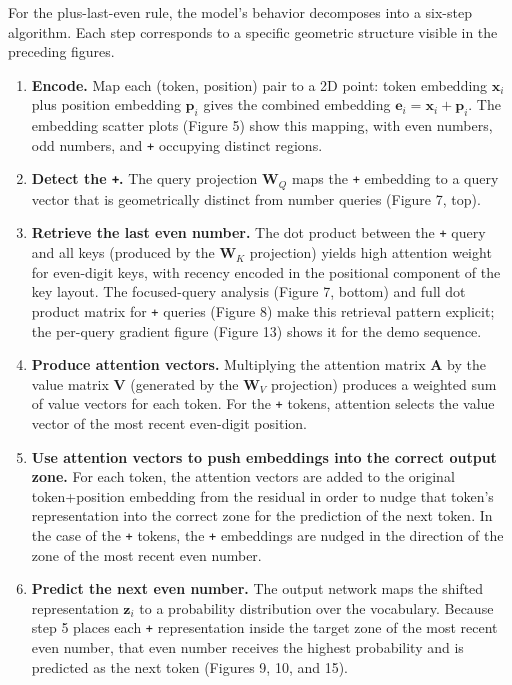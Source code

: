 \documentclass[
  11pt,
  a4paper,
]{article}
\begin{document}
For the plus-last-even rule, the model's behavior decomposes into a
six-step algorithm. Each step corresponds to a specific geometric
structure visible in the preceding figures.

\begin{enumerate}
\def\labelenumi{\arabic{enumi}.}
\item
  \textbf{Encode.} Map each (token, position) pair to a 2D point: token
  embedding \(\mathbf{x}_i\) plus position embedding \(\mathbf{p}_i\)
  gives the combined embedding
  \(\mathbf{e}_i = \mathbf{x}_i + \mathbf{p}_i\). The embedding scatter
  plots (Figure 5) show this mapping, with even numbers, odd numbers,
  and \texttt{+} occupying distinct regions.
\item
  \textbf{Detect the \texttt{+}.} The query projection \(\mathbf{W}_Q\)
  maps the \texttt{+} embedding to a query vector that is geometrically
  distinct from number queries (Figure 7, top).
\item
  \textbf{Retrieve the last even number.} The dot product between the
  \texttt{+} query and all keys (produced by the \(\mathbf{W}_K\)
  projection) yields high attention weight for even-digit keys, with
  recency encoded in the positional component of the key layout. The
  focused-query analysis (Figure 7, bottom) and full dot product matrix
  for \texttt{+} queries (Figure 8) make this retrieval pattern
  explicit; the per-query gradient figure (Figure 13) shows it for the
  demo sequence.
\item
  \textbf{Produce attention vectors.} Multiplying the attention matrix
  \(\mathbf{A}\) by the value matrix \(\mathbf{V}\) (generated by the
  \(\mathbf{W}_V\) projection) produces a weighted sum of value vectors
  for each token. For the \texttt{+} tokens, attention selects the value
  vector of the most recent even-digit position.
\item
  \textbf{Use attention vectors to push embeddings into the correct
  output zone.} For each token, the attention vectors are added to the
  original token+position embedding from the residual in order to nudge
  that token's representation into the correct zone for the prediction
  of the next token. In the case of the \texttt{+} tokens, the
  \texttt{+} embeddings are nudged in the direction of the zone of the
  most recent even number.
\item
  \textbf{Predict the next even number.} The output network maps the
  shifted representation \(\mathbf{z}_i\) to a probability distribution
  over the vocabulary. Because step 5 places each \texttt{+}
  representation inside the target zone of the most recent even number,
  that even number receives the highest probability and is predicted as
  the next token (Figures 9, 10, and 15).
\end{enumerate}
\end{document}
